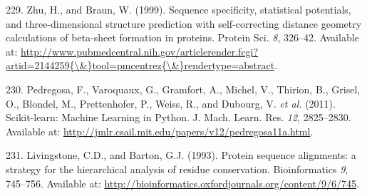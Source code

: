 \documentclass[11pt,a4paper,twoside]{book}
\theoremstyle{definition}
\theoremstyle{definition}
\theoremstyle{remark}
\begin{document}
\hypertarget{ref-Zhu1999}{}
229. Zhu, H., and Braun, W. (1999). Sequence specificity, statistical
potentials, and three-dimensional structure prediction with
self-correcting distance geometry calculations of beta-sheet formation
in proteins. Protein Sci. \emph{8}, 326--42. Available at:
\href{http://www.pubmedcentral.nih.gov/articlerender.fcgi?artid=2144259\%7B/\&\%7Dtool=pmcentrez\%7B/\&\%7Drendertype=abstract}{http://www.pubmedcentral.nih.gov/articlerender.fcgi?artid=2144259\{\textbackslash{}\&\}tool=pmcentrez\{\textbackslash{}\&\}rendertype=abstract}.

\hypertarget{ref-Pedregosa2011}{}
230. Pedregosa, F., Varoquaux, G., Gramfort, A., Michel, V., Thirion,
B., Grisel, O., Blondel, M., Prettenhofer, P., Weiss, R., and Dubourg,
V. \emph{et al.} (2011). Scikit-learn: Machine Learning in Python. J.
Mach. Learn. Res. \emph{12}, 2825--2830. Available at:
\url{http://jmlr.csail.mit.edu/papers/v12/pedregosa11a.html}.

\hypertarget{ref-Livingstone1993}{}
231. Livingstone, C.D., and Barton, G.J. (1993). Protein sequence
alignments: a strategy for the hierarchical analysis of residue
conservation. Bioinformatics \emph{9}, 745--756. Available at:
\url{http://bioinformatics.oxfordjournals.org/content/9/6/745}.
\end{document}
